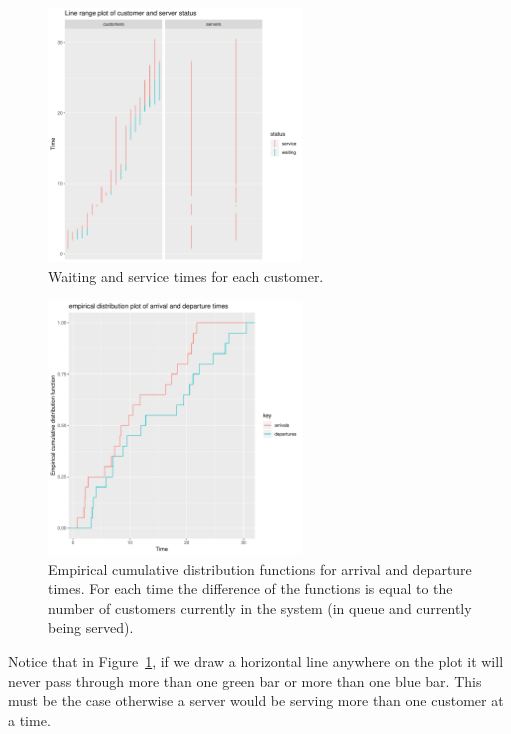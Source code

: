 \documentclass[article]{jss}
\begin{document}
\begin{figure}[t!]
\centering
\includegraphics[width = 0.6\textwidth, trim = 0 5 0 5, clip]{customers_083.pdf}
\caption{Waiting and service times for each customer. }
\label{fig:customers}
\end{figure}

\begin{figure}[t!]
\centering
\includegraphics[width = 0.6\textwidth, trim = 0 5 0 5, clip]{ecdf_083.pdf}
\caption{Empirical cumulative distribution functions for arrival and
  departure times. For each time the difference of the functions is
  equal to the number of customers currently in the system (in queue
  and currently being served).}
\label{fig:ecdf}
\end{figure}

Notice that in Figure~\ref{fig:customers}, if we draw a horizontal
line anywhere on the plot it will never pass through more than one
green bar or more than one blue bar. This must be the case otherwise a
server would be serving more than one customer at a time.
\end{document}
